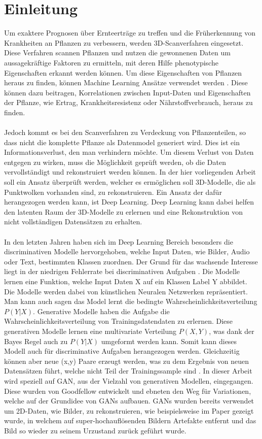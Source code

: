 \documentclass{llncs}
\begin{document}
\section{Einleitung}%
Um exaktere Prognosen über Ernteerträge zu treffen und die Früherkennung von Krankheiten an Pflanzen zu verbessern, werden 3D-Scanverfahren eingesetzt. Diese Verfahren scannen Pflanzen und nutzen die gewonnenen Daten um aussagekräftige Faktoren zu ermitteln, mit deren Hilfe phenotypische Eigenschaften erkannt werden können. Um diese Eigenschaften von Pflanzen heraus zu finden, können Machine Learning Ansätze verwendet werden \cite{plants}. Diese können dazu beitragen, Korrelationen zwischen Input-Daten und Eigenschaften der Pflanze, wie Ertrag, Krankheitsresistenz oder Nährstoffverbrauch, heraus zu finden. 
\\\\
Jedoch kommt es bei den Scanverfahren zu Verdeckung von Pflanzenteilen, so dass nicht die komplette Pflanze als Datenmodel generiert wird. Dies ist ein Informationsverlust, den man verhindern möchte. Um diesem Verlust von Daten entgegen zu wirken, muss die Möglichkeit geprüft werden, ob die Daten vervollständigt und rekonstruiert werden können. In der hier vorliegenden Arbeit soll ein Ansatz überprüft werden, welcher es ermöglichen soll 3D-Modelle, die als Punktwolken vorhanden sind, zu rekonstruieren. Ein Ansatz der dafür herangezogen werden kann, ist Deep Learning. Deep Learning kann dabei helfen den latenten Raum der 3D-Modelle zu erlernen und eine Rekonstruktion von nicht vollständigen Datensätzen zu erhalten. 
\\\\
In den letzten Jahren haben sich im Deep Learning Bereich besonders die discriminativen Modelle hervorgehoben, welche Input Daten, wie Bilder, Audio oder Text, bestimmten Klassen zuordnen. Der Grund für das wachsende Interesse liegt in der niedrigen Fehlerrate bei discriminativen Aufgaben \cite{goodfellow2014}. Die Modelle lernen eine Funktion, welche Input Daten X auf ein Klassen Label Y abbildet. Die Modelle werden dabei von künstlichen Neuralen Netzwerken repräsentiert. Man kann auch sagen das Model lernt die bedingte Wahrscheinlichkeitsverteilung $P(Y|X)$. Generative Modelle haben die Aufgabe die Wahrscheinlichkeitsverteilung von Trainingsdatendaten zu erlernen. Diese generativen Modelle lernen eine multivariate Verteilung $P(X,Y)$, was dank der Bayes Regel auch zu $P(Y|X)$ umgeformt werden kann. Somit kann dieses Modell auch für discriminative Aufgaben herangezogen werden. Gleichzeitig können aber neue (x,y) Paare erzeugt werden, was zu dem Ergebnis von neuen Datensätzen führt, welche nicht Teil der Trainingssample sind \cite{discrim}. In dieser Arbeit wird speziell auf GAN, aus der Vielzahl von generativen Modellen, eingegangen. Diese wurden von Goodfellow\cite{goodfellow2014} entwickelt und ebneten den Weg für Variationen, welche auf der Grundidee von GANs aufbauen. GANs wurden bereits verwendet um 2D-Daten, wie Bilder, zu rekonstruieren, wie beispielsweise im Paper \cite{imagere1} gezeigt wurde, in welchem auf super-hochauflösenden Bildern Artefakte entfernt und das Bild so wieder zu seinem Urzustand zurück geführt wurde.
\end{document}
